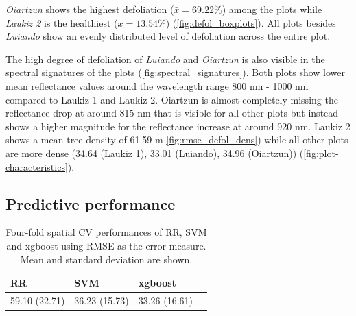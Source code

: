 \documentclass[review]{elsarticle}
\begin{document}
\textit{Oiartzun} shows the highest defoliation ($\bar{x} = 69.22 \%$) among the plots while \textit{Laukiz 2} is the healthiest ($\bar{x} = 13.54 \%$) (\autoref{fig:defol_boxplots}).
All plots besides \textit{Luiando} show an evenly distributed level of defoliation across the entire plot.

The high degree of defoliation of \textit{Luiando} and \textit{Oiartzun} is also visible in the spectral signatures of the plots (\autoref{fig:spectral_signatures}).
Both plots show lower mean reflectance values around the wavelength range 800 nm - 1000 nm compared to Laukiz 1 and Laukiz 2.
Oiartzun is almost completely missing the reflectance drop at around 815 nm that is visible for all other plots but instead shows a higher magnitude for the reflectance increase at around 920 nm.
Laukiz 2 shows a mean tree density of 61.59 m \autoref{fig:rmse_defol_dens}) while all other plots are more dense (34.64 (Laukiz 1), 33.01 (Luiando), 34.96 (Oiartzun)) (\autoref{fig:plot-characteristics}).

\subsection{Predictive performance}

\begin{table}[b!]
\centering
\caption[t]{Four-fold spatial \ac{CV} performances of RR, SVM and xgboost using \ac{RMSE} as the error measure.
	Mean and standard deviation are shown.}
\begingroup\footnotesize
\begin{tabular}{llll}
	RR            & SVM           & xgboost       \\
	\hline
	59.10 (22.71) & 36.23 (15.73) & 33.26 (16.61) \\
	\bottomrule
\end{tabular}
\endgroup
\label{tab:penalty_comparison}
\end{table}
\end{document}
